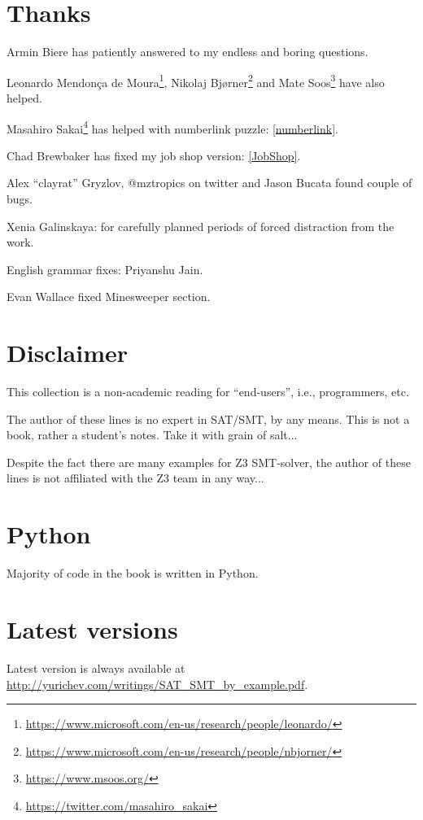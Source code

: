 \section{Thanks}

Armin Biere has patiently answered to my endless and boring questions.

Leonardo Mendonça de Moura\footnote{\url{https://www.microsoft.com/en-us/research/people/leonardo/}},
Nikolaj Bjørner\footnote{\url{https://www.microsoft.com/en-us/research/people/nbjorner/}}
and Mate Soos\footnote{\url{https://www.msoos.org/}} have also helped.

Masahiro Sakai\footnote{\url{https://twitter.com/masahiro_sakai}} has helped with numberlink puzzle: \ref{numberlink}.

Chad Brewbaker has fixed my job shop version: \ref{JobShop}.

Alex ``clayrat'' Gryzlov, @mztropics on twitter and Jason Bucata found couple of bugs.

Xenia Galinskaya: for carefully planned periods of forced distraction from the work.

English grammar fixes: Priyanshu Jain.

Evan Wallace fixed Minesweeper section.

\section{Disclaimer}

This collection is a non-academic reading for ``end-users'', i.e., programmers, etc.

The author of these lines is no expert in SAT/SMT, by any means.
This is not a book, rather a student's notes.
Take it with grain of salt...

Despite the fact there are many examples for Z3 SMT-solver,
the author of these lines is not affiliated with the Z3 team in any way...

\section{Python}

Majority of code in the book is written in Python.

\section{Latest versions}

Latest version is always available at \url{http://yurichev.com/writings/SAT_SMT_by_example.pdf}.

